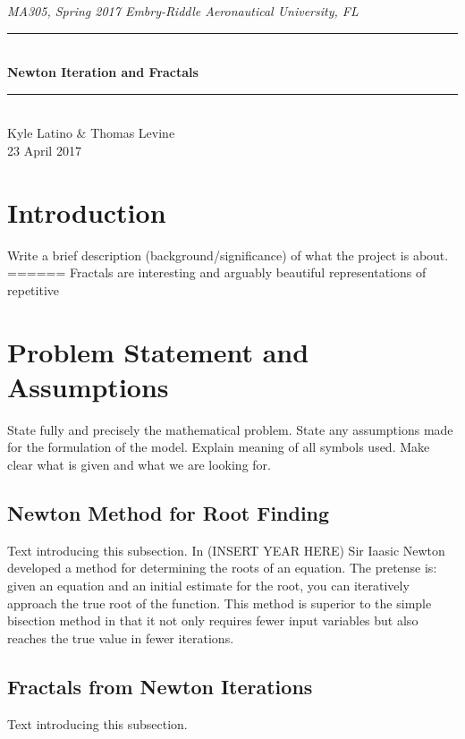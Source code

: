 \documentclass[11pt]{article}
\newcommand{\horrule}[1]{\rule{\linewidth}{#1}} 	%
\begin{document}
\begin{center}
{\it MA305, Spring 2017 \hfill Embry-Riddle Aeronautical University, FL 
 }
		\horrule{0.5pt} \\[0.4cm]
		{\bf \Large  Newton Iteration and Fractals}\\
		\horrule{2pt} \\[2cm]
Kyle Latino \& Thomas Levine
\\[0.4cm]
23 April 2017 %
\end{center}
\thispagestyle{empty}
\newpage
\begin{abstract}

\end{abstract}
\tableofcontents 
\newpage

\section{Introduction}\label{S:1}
Write a brief description (background/significance) of what the project is about. ====== Fractals are interesting and arguably beautiful representations of repetitive 


\section{Problem Statement and Assumptions}\label{S:2}
State fully and precisely the mathematical problem. 
State any assumptions made for the formulation of the model. 
Explain meaning of all symbols used. Make clear what is given and what we are looking for. 

\subsection{Newton Method for Root Finding}\label{S:2.1}
%
Text introducing this subsection. 
In (INSERT YEAR HERE) Sir Iaasic Newton developed a method for determining the roots of an equation. The pretense is: given an equation and an initial estimate for the root, you can iteratively approach the true root of the function. This method is superior to the simple bisection method in that it not only requires fewer input variables but also reaches the true value in fewer iterations. 

\subsection{Fractals from Newton Iterations}\label{S:2.2}
%
Text introducing this subsection.
\end{document}
